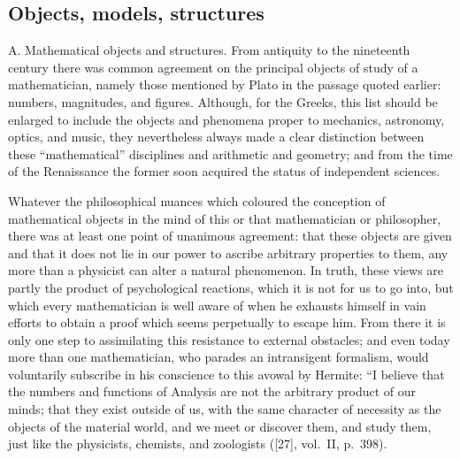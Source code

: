 \subsection*{Objects, models, structures}

A. Mathematical objects and structures. From antiquity to the nineteenth century there was common agreement on the principal objects of study of a mathematician, namely those mentioned by Plato in the passage quoted earlier: numbers, magnitudes, and figures. Although, for the Greeks, this list should be enlarged to include the objects and phenomena proper to mechanics, astronomy, optics, and music, they nevertheless always made a clear distinction between these ``mathematical'' disciplines and arithmetic and geometry; and from the time of the Renaissance the former soon acquired the status of independent sciences.

Whatever the philosophical nuances which coloured the conception of mathematical objects in the mind of this or that mathematician or philosopher, there was at least one point of unanimous agreement: that these objects are given and that it does not lie in our power to ascribe arbitrary properties to them, any more than a physicist can alter a natural phenomenon. In truth, these views are partly the product of psychological reactions, which it is not for us to go into, but which every mathematician is well aware of when he exhausts himself in vain efforts to obtain a proof which seems perpetually to escape him. From there it is only one step to assimilating this resistance to external obstacles; and even today more than one mathematician, who parades an intransigent formalism, would voluntarily subscribe in his conscience to this avowal by Hermite: ``I believe that the numbers and functions of Analysis are not the arbitrary product of our minds; that they exist outside of us, with the same character of necessity as the objects of the material world, and we meet or discover them, and study them, just like the physicists, chemists, and zoologists ({[}27{]}, vol.~II, p.~398).


